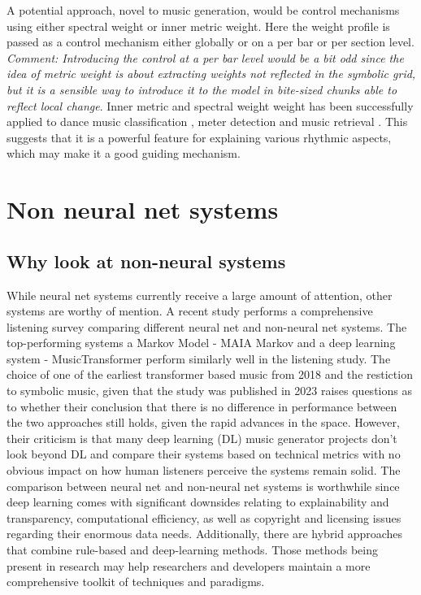 A potential approach, novel to music generation, would be control mechanisms using either spectral weight or inner metric weight. Here the weight profile is passed as a control mechanism either globally or on a per bar or per section level. \textit{Comment: Introducing the control at a per bar level would be a bit odd since the idea of metric weight is about extracting weights not reflected in the symbolic grid, but it is a sensible way to introduce it to the model in bite-sized chunks able to reflect local change}. Inner metric and spectral weight weight has been successfully applied to dance music classification \cite{Chew_Volk_Lee_Dance_metric_weight_2005}, meter detection \cite{Haas_Volk_2016} and music retrieval \cite{Volk_Garbers_VanKranenburg_Wiering_Grijp_Veltkamp_2009}. This suggests that it is a powerful feature for explaining various rhythmic aspects, which may make it a good guiding mechanism. 

\section{Non neural net systems}

\subsection{Why look at non-neural systems}
While neural net systems currently receive a large amount of attention, other systems are worthy of mention. A recent study \cite{Yin_Reuben_Stepney_Collins_2023} performs a comprehensive listening survey comparing different neural net and non-neural net systems. The top-performing systems a Markov Model -  MAIA Markov \cite{Collins_Laney_2017}  and a deep learning system  - MusicTransformer \cite{Huang_Vaswani_Uszkoreit_Shazeer_Simon_Hawthorne_Dai_Hoffman_Dinculescu_Eck_2018} perform similarly well in the listening study. The choice of one of the earliest transformer based music from 2018 \cite{Huang_Vaswani_Uszkoreit_Shazeer_Simon_Hawthorne_Dai_Hoffman_Dinculescu_Eck_2018} and the restiction to symbolic music, given that the study was published in 2023 raises questions as to whether their conclusion that there is no difference in performance between the two approaches still holds, given the rapid advances in the space. However, their criticism is that many deep learning (DL) music generator projects don’t look beyond DL and compare their systems based on technical metrics with no obvious impact on how human listeners perceive the systems remain solid. The comparison between neural net and non-neural net systems is worthwhile since deep learning comes with significant downsides relating to explainability and transparency, computational efficiency, as well as copyright and licensing issues regarding their enormous data needs. Additionally, there are hybrid approaches that combine rule-based and deep-learning methods. Those methods being present in research may help researchers and developers maintain a more comprehensive toolkit of techniques and paradigms. 

